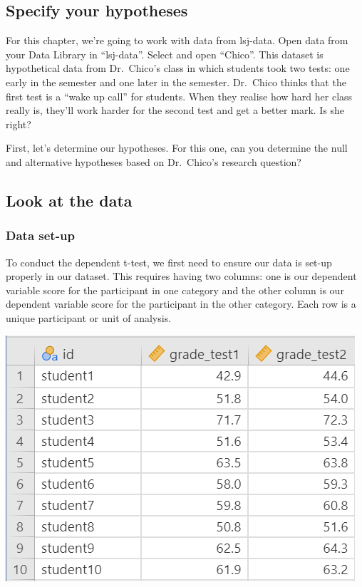 \documentclass[
]{book}
\begin{document}
\hypertarget{specify-your-hypotheses-1}{%
\subsection{Specify your hypotheses}\label{specify-your-hypotheses-1}}

For this chapter, we're going to work with data from lsj-data. Open data from your Data Library in ``lsj-data''. Select and open ``Chico''. This dataset is hypothetical data from Dr.~Chico's class in which students took two tests: one early in the semester and one later in the semester. Dr.~Chico thinks that the first test is a ``wake up call'' for students. When they realise how hard her class really is, they'll work harder for the second test and get a better mark. Is she right?

First, let's determine our hypotheses. For this one, can you determine the null and alternative hypotheses based on Dr.~Chico's research question?

\hypertarget{look-at-the-data-2}{%
\subsection{Look at the data}\label{look-at-the-data-2}}

\hypertarget{data-set-up-2}{%
\subsubsection{Data set-up}\label{data-set-up-2}}

To conduct the dependent t-test, we first need to ensure our data is set-up properly in our dataset. This requires having two columns: one is our dependent variable score for the participant in one category and the other column is our dependent variable score for the participant in the other category. Each row is a unique participant or unit of analysis.

\includegraphics{images/03_dependent_t-test/dependent_data.png}
\end{document}
